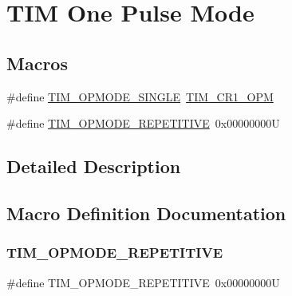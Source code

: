 \hypertarget{group___t_i_m___one___pulse___mode}{}\section{T\+IM One Pulse Mode}
\label{group___t_i_m___one___pulse___mode}
\subsection*{Macros}
\begin{DoxyCompactItemize}
\item 
\#define \hyperlink{group___t_i_m___one___pulse___mode_gab0447b341024e86145c7ce0dc2931fc6}{T\+I\+M\+\_\+\+O\+P\+M\+O\+D\+E\+\_\+\+S\+I\+N\+G\+LE}~\hyperlink{group___peripheral___registers___bits___definition_ga6d3d1488296350af6d36fbbf71905d29}{T\+I\+M\+\_\+\+C\+R1\+\_\+\+O\+PM}
\item 
\#define \hyperlink{group___t_i_m___one___pulse___mode_ga14a7b6f95769c5b430f65189d9c7cfa3}{T\+I\+M\+\_\+\+O\+P\+M\+O\+D\+E\+\_\+\+R\+E\+P\+E\+T\+I\+T\+I\+VE}~0x00000000U
\end{DoxyCompactItemize}


\subsection{Detailed Description}


\subsection{Macro Definition Documentation}
\mbox{\label{group___t_i_m___one___pulse___mode_ga14a7b6f95769c5b430f65189d9c7cfa3}} 
\subsubsection{\texorpdfstring{T\+I\+M\+\_\+\+O\+P\+M\+O\+D\+E\+\_\+\+R\+E\+P\+E\+T\+I\+T\+I\+VE}{TIM\_OPMODE\_REPETITIVE}}
{\footnotesize\ttfamily \#define T\+I\+M\+\_\+\+O\+P\+M\+O\+D\+E\+\_\+\+R\+E\+P\+E\+T\+I\+T\+I\+VE~0x00000000U}

